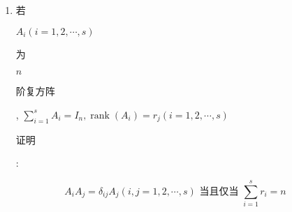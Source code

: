 \documentclass[10pt]{article}
\begin{document}
\begin{enumerate}
  \item \begin{CJK}{UTF8}{mj}若\end{CJK} $A_{i}(i=1,2, \cdots, s)$ \begin{CJK}{UTF8}{mj}为\end{CJK} $n$ \begin{CJK}{UTF8}{mj}阶复方阵\end{CJK}, $\sum_{i=1}^{s} A_{i}=I_{n}, \operatorname{rank}\left(A_{i}\right)=r_{j}(i=1,2, \cdots, s)$ \begin{CJK}{UTF8}{mj}证明\end{CJK}:

\end{enumerate}
$$
A_{i} A_{j}=\delta_{i j} A_{j}(i, j=1,2, \cdots, s) \text { 当且仅当 } \sum_{i=1}^{s} r_{i}=n
$$
\end{document}
